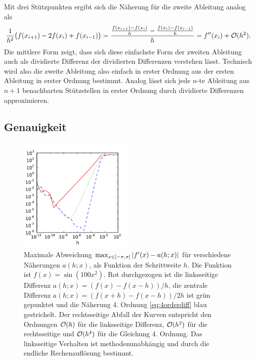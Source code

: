 Mit drei Stützpunkten ergibt sich die Näherung für die zweite
Ableitung analog als
\begin{multline}
  \label{eq:1order2diff}
  \frac{1}{h^2}\bigl(f(x_{i+1}) -
  2f(x_i)  + f(x_{i-1})\bigr) =
  \frac{\frac{f(x_{i+1}) - f(x_i)}{h}  -
    \frac{f(x_i) - f(x_{i-1})}{h}}{h}
  = f''(x_i) + \mathcal O(h^2).
\end{multline}
Die mittlere Form zeigt, dass sich diese einfachste Form der zweiten
Ableitung auch als dividierte Differenz der dividierten Differenzen
verstehen lässt. Technisch wird also die zweite Ableitung also einfach
in erster Ordnung aus der ersten Ableitung in erster Ordnung
bestimmt. Analog lässt sich jede $n$-te Ableitung aus $n+1$
benachbarten Stützstellen in erster Ordnung durch dividierte
Differenzen approximieren.

\subsection{Genauigkeit}

\begin{figure}
  \centering
  \includegraphics[width=0.5\textwidth]{plots/num_diff}
  \caption{Maximale Abweichung $\max_{x\in[-\pi,\pi]} \left\lvert{f'(x) - a(h;
      x)}\right\rvert$ für verschiedene Näherungen $a(h; x)$, als Funktion der
    Schrittweite $h$. Die Funktion ist $f(x)=\sin(100x^2)$. Rot
    durchgezogen ist die linksseitige Differenz $a(h; x) = (f(x) -
    f(x-h))/h$, die zentrale Differenz $a(h; x) = (f(x+h) -
    f(x-h))/2h$ ist grün gepunktet und die Näherung 4. Ordnung
    \eqref{eq:4orderdiff} blau gestrichelt. Der rechtsseitige Abfall
    der Kurven entspricht den Ordnungen $\mathcal O(h)$ für die linksseitige
    Differenz, $\mathcal O(h^2)$ für die rechtsseitige und $\mathcal O(h^4)$ für die
    Gleichung 4. Ordnung. Das linksseitige Verhalten ist
    methodenunabhängig und durch die endliche Rechenauflösung bestimmt.}
  \label{fig:num_diff}
\end{figure}


